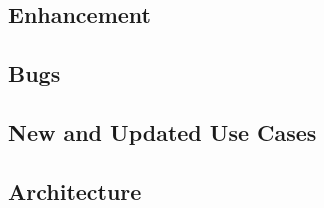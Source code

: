 \subsection{Enhancement}
\label{sec:enhancement}


\subsection{Bugs}
\label{sec:bugs}


\subsection{New and Updated Use Cases}
\label{sec:use-cases}


\subsection{Architecture}
\label{sec:architecture}


